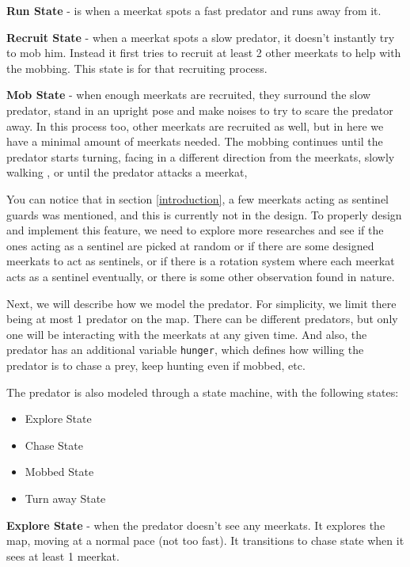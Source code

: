 \documentclass[9pt,twoside]{pnas-new}
\begin{document}
\textbf{Run State} - is when a meerkat spots a fast predator and runs away from it.

\textbf{Recruit State} - when a meerkat spots a slow predator, it doesn't instantly try to mob him. Instead it first tries to recruit at least 2 other meerkats to help with the mobbing. This state is for that recruiting process.

\textbf{Mob State} - when enough meerkats are recruited, they surround the slow predator, stand in an upright pose and make noises to try to scare the predator away. 
In this process too, other meerkats are recruited as well, but in here we have a minimal amount of meerkats needed. The mobbing continues until the predator starts turning, facing in a different direction from the meerkats, slowly walking , or until the predator attacks a meerkat,

You can notice that in section \ref{introduction}, a few meerkats acting as sentinel guards was mentioned, and this is currently not in the design. To properly design and implement this feature, we need to explore more researches and see if the ones acting as a sentinel are picked at random or if there are some designed meerkats to act as sentinels, or if there is a rotation system where each meerkat acts as a sentinel eventually, or there is some other observation found in nature.

Next, we will describe how we model the predator. For simplicity, we limit there being at most 1 predator on the map. There can be different predators, but only one will be interacting with the meerkats at any given time. And also, the predator has an additional variable \verb|hunger|, which defines how willing the predator is to chase a prey, keep hunting even if mobbed, etc.

The predator is also modeled through a state machine, with the following states:
\begin{itemize}
    \item Explore State
    \item Chase State
    \item Mobbed State
    \item Turn away State
\end{itemize}

\textbf{Explore State} - when the predator doesn't see any meerkats. It explores the map, moving at a normal pace (not too fast). It transitions to chase state when it sees at least 1 meerkat.
\end{document}
